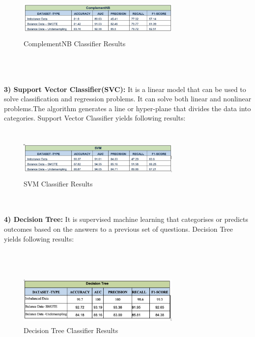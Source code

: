 \documentclass[a4paper, 10pt, conference]{ieeeconf}      %
\begin{document}
\begin{figure}[htp]
    \centering
    \includegraphics[width=8cm,height=2cm]{Images/ComplementNB.png}
    \caption{ComplementNB Classifier Results}
    \label{fig:ComplementNB}
\end{figure}
\\\
\\\
\\\textbf{3) Support Vector Classifier(SVC):} It is a linear model that can be used to solve classification and regression problems. It can solve both linear and nonlinear problems.The algorithm generates a line or hyper-plane that divides the data into categories.
 Support Vector Classifier yields following results:
\\\
\begin{figure}[htp]
    \centering
    \includegraphics[width=8cm,height=2cm]{Images/svm.png}
    \caption{SVM Classifier Results}
    \label{fig:svm}
\end{figure}
\\\
\\\textbf{4) Decision Tree:} It is supervised machine learning that categorises or predicts outcomes based on the answers to a previous set of questions.
Decision Tree yields following results:

\\\
\begin{figure}[htp]
    \centering
    \includegraphics[width=8cm,height=2.5cm]{Images/decisionTree.png}
    \caption{Decision Tree Classifier Results}
    \label{fig:decisionTree}
\end{figure}
\\
\end{document}
